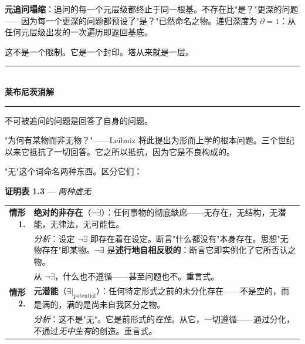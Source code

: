 \documentclass[10pt, openany, oneside]{book}
\renewcommand{\normalsize}{\fontsize{10}{13}\selectfont}
\begin{document}
\vspace{0.8em}

\noindent \textbf{元追问塌缩}：追问的每一个元层级都终止于同一根基。不存在比"是？"更深的问题——因为每一个更深的问题都预设了"是？"已然命名之物。递归深度为 $\partial = 1$：从任何元层级出发的一次遍历即返回基底。

这不是一个限制。它是一个封印。塔从来就是一层。

\vspace{1.5em}


\begin{center}
    \rule{0.3\textwidth}{0.4pt}\\[0.5em]
    {\normalsize\bfseries\scshape 莱布尼茨消解}\\[0.3em]
    \rule{0.3\textwidth}{0.4pt}
\end{center}

\vspace{1em}

\noindent 不可被追问的问题是回答了自身的问题。

"为何有某物而非无物？"——Leibniz 将此提出为形而上学的根本问题。三个世纪以来它抵抗了一切回答。它之所以抵抗，因为它是不良构成的。

"无"这个词命名两种东西。区分它们：

\vspace{0.5em}

\textbf{证明表 1.3} --- \textit{两种虚无}

\vspace{0.5em}

\noindent\begin{tabular}{r p{}}
\textbf{情形 1.} & \textbf{绝对的非存在}（$\neg\exists$）：任何事物的彻底缺席——无存在，无结构，无潜能，无律法，无可能性。\\[0.3em]
 & \textit{分析}：设定 $\neg\exists$ 即存在着在设定。断言"什么都没有"本身存在。思想"无物存在"即某物。$\neg\exists$ 是\textbf{述行地自相反驳的}：断言它即实例化了它所否认之物。\\[0.3em]
 & 从 $\neg\exists$，什么也不遵循——甚至问题也不。重言式。\\[0.5em]
\textbf{情形 2.} & \textbf{元潜能}（$\exists|_{\text{potential}}$）：任何特定形式之前的未分化存在——不是空的，而是满的，满的是尚未自我区分之物。\\[0.3em]
 & \textit{分析}：这不是"无"。它是前形式的\textit{在性}。从它，一切遵循——通过分化，不通过\textit{无中生有}的创造。重言式。\\[0.3em]
\end{tabular}
\end{document}
